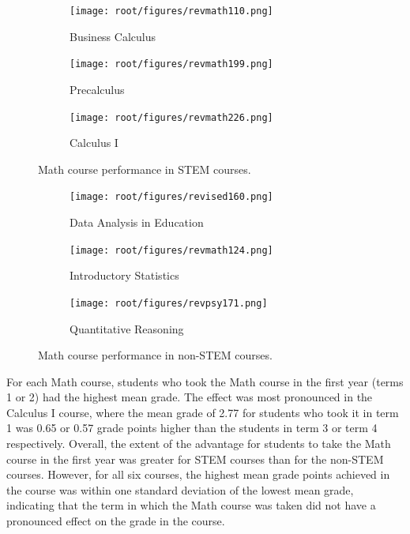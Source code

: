 \begin{figure}[htbp]
\centering
    \begin{subfigure}[b]{0.31\textwidth}
    \texttt{[image: root/figures/revmath110.png]}
    \centering
    \caption{Business Calculus}
    \end{subfigure}
    \hspace{2mm}
    \begin{subfigure}[b]{0.31\textwidth}
    \centering
    \texttt{[image: root/figures/revmath199.png]}
    \caption{Precalculus}
    \end{subfigure}
    \hspace{2mm}
    \begin{subfigure}[b]{0.31\textwidth}
    \centering
    \texttt{[image: root/figures/revmath226.png]}
    \caption{Calculus I}
    \end{subfigure}
\caption{Math course performance in STEM courses.}
\label{Math_STEM_courses}
\end{figure}

\begin{figure}[htbp]
\centering
    \begin{subfigure}[b]{0.3\textwidth}
    \centering
    \texttt{[image: root/figures/revised160.png]}
    \caption{Data Analysis in Education}
    \end{subfigure}
    \hspace{4mm}
    \begin{subfigure}[b]{0.3\textwidth}
    \texttt{[image: root/figures/revmath124.png]}
    \centering
    \caption{Introductory Statistics \\  \hspace{2mm} }
    \end{subfigure}
    \hspace{4mm}
    \begin{subfigure}[b]{0.3\textwidth}
    \centering
    \texttt{[image: root/figures/revpsy171.png]}
    \caption{Quantitative Reasoning \\  \hspace{2mm}}
    \end{subfigure}
\caption{Math course performance in non-STEM courses.}
\label{Math_nonSTEM_courses}
\end{figure}

For each Math course, students who took the Math course in the first year (terms 1 or 2) had the highest mean grade.  The effect was most pronounced in the Calculus I course, where the mean grade of 2.77 for students who took it in term 1 was 0.65 or 0.57 grade points higher than the students in term 3 or term 4 respectively. Overall, the extent of the advantage for students to take the Math course in the first year was greater for STEM courses than for the non-STEM courses.  However, for all six courses, the highest mean grade points achieved in the course was within one standard deviation of the lowest mean grade, indicating that the term in which the Math course was taken did not have a pronounced effect on the grade in the course.  

